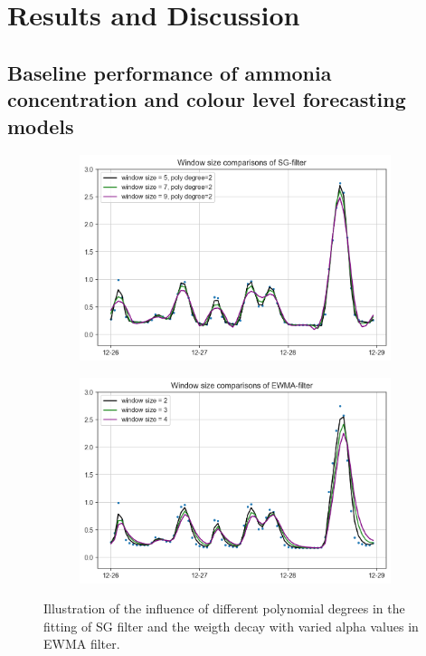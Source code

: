 \chapter{Results and Discussion}
\section{Baseline performance of ammonia concentration and colour level forecasting models}

\begin{figure}[h]
    \centering
    \begin{subfigure}{0.45\textwidth}
      \includegraphics[width=\linewidth]{imgs/pre-processing/sg-filter.png}
      \caption{} \label{fig:smoothed-sg}
    \end{subfigure}%
    \hspace{2em}%
    \begin{subfigure}{0.45\textwidth}
      \includegraphics[width=\linewidth]{imgs/pre-processing/ew-filter.png}
      \caption{} \label{fig:smoothed-ew}
    \end{subfigure}%
  \caption{Illustration of the influence of different polynomial degrees in the fitting of SG filter and the weigth decay with varied alpha values in EWMA filter.} \label{fig:smoothed}
  
\end{figure}
